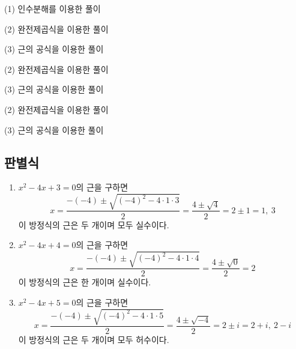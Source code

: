 \documentclass{oblivoir}
\begin{document}
\clearpage
%
\label{quad2}
\begin{mdframed}
(1) 인수분해를 이용한 풀이
\vspace{0.06\textheight}
\end{mdframed}

\begin{mdframed}
(2) 완전제곱식을 이용한 풀이
\vspace{0.2\textheight}
\end{mdframed}

\begin{mdframed}
(3) 근의 공식을 이용한 풀이
\vspace{0.1\textheight}
\end{mdframed}

%
\label{quad3}
\begin{mdframed}
(2) 완전제곱식을 이용한 풀이
\vspace{0.2\textheight}
\end{mdframed}

\begin{mdframed}
(3) 근의 공식을 이용한 풀이
\vspace{0.1\textheight}
\end{mdframed}

%
\label{quad4}
\begin{mdframed}
(2) 완전제곱식을 이용한 풀이
\vspace{0.2\textheight}
\end{mdframed}

\begin{mdframed}
(3) 근의 공식을 이용한 풀이
\vspace{0.1\textheight}
\end{mdframed}

\clearpage
\subsection{판별식}
%
\exam{}
\begin{enumerate}
\item
\(x^2-4x+3=0\)의 근을 구하면
\[x=\frac{-(-4)\pm\sqrt{(-4)^2-4\cdot1\cdot3}}2=\frac{4\pm\sqrt4}2=2\pm1=1,\:3\]
이 방정식의 근은 두 개이며 모두 실수이다.
\item
\(x^2-4x+4=0\)의 근을 구하면
\[x=\frac{-(-4)\pm\sqrt{(-4)^2-4\cdot1\cdot4}}2=\frac{4\pm\sqrt0}2=2\]
이 방정식의 근은 한 개이며 실수이다.
\item
\(x^2-4x+5=0\)의 근을 구하면
\[x=\frac{-(-4)\pm\sqrt{(-4)^2-4\cdot1\cdot5}}2=\frac{4\pm\sqrt{-4}}2=2\pm i=2+i,\:2-i\]
이 방정식의 근은 두 개이며 모두 허수이다.
\end{enumerate}
\end{document}

